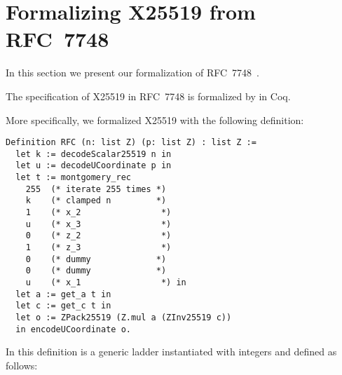 \section{Formalizing X25519 from RFC~7748}
\label{sec:Coq-RFC}

In this section we present our formalization of RFC~7748~\cite{rfc7748}.

\begin{informaltheorem}
The specification of X25519 in RFC~7748 is formalized by  in Coq.
\end{informaltheorem}

More specifically, we formalized X25519 with the following definition:
\begin{lstlisting}[language=Coq]
Definition RFC (n: list Z) (p: list Z) : list Z :=
  let k := decodeScalar25519 n in
  let u := decodeUCoordinate p in
  let t := montgomery_rec
    255  (* iterate 255 times *)
    k    (* clamped n         *)
    1    (* x_2                *)
    u    (* x_3                *)
    0    (* z_2                *)
    1    (* z_3                *)
    0    (* dummy             *)
    0    (* dummy             *)
    u    (* x_1                *) in
  let a := get_a t in
  let c := get_c t in
  let o := ZPack25519 (Z.mul a (ZInv25519 c))
  in encodeUCoordinate o.
\end{lstlisting}

In this definition  is a generic ladder instantiated
with integers and defined as follows:


